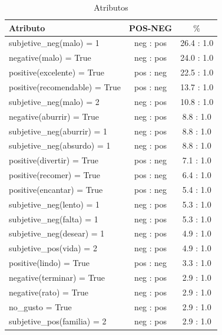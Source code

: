 \documentclass[12pt]{article}
\begin{document}
\begin{table}[!htb]
\begin{center}
\begin{tabular}{|l|c|c|} 
\hline
 \multicolumn{1}{|l}{Atributo}&
 \multicolumn{1}{|c}{POS-NEG}&
 \multicolumn{1}{|c|}{$\%$}
\tabularnewline
  \hline
     subjetive\_neg(malo) = 1         &        neg : pos    &     26.4 : 1.0 \\ \hline
          negative(malo) = True      &        neg : pos    &     24.0 : 1.0 \\ \hline
     positive(excelente) = True      &        pos : neg    &     22.5 : 1.0 \\ \hline
  positive(recomendable) = True      &        pos : neg    &     13.7 : 1.0 \\ \hline
     subjetive\_neg(malo) = 2         &        neg : pos    &     10.8 : 1.0 \\ \hline
       negative(aburrir) = True      &        neg : pos    &      8.8 : 1.0 \\ \hline
  subjetive\_neg(aburrir) = 1         &        neg : pos    &      8.8 : 1.0 \\ \hline
  subjetive\_neg(absurdo) = 1         &        neg : pos    &      8.8 : 1.0 \\ \hline
      positive(divertir) = True      &        pos : neg    &      7.1 : 1.0 \\ \hline
       positive(recomer) = True      &        pos : neg    &      6.4 : 1.0 \\ \hline
      positive(encantar) = True      &        pos : neg    &      5.4 : 1.0 \\ \hline
    subjetive\_neg(lento) = 1         &        neg : pos    &      5.3 : 1.0 \\ \hline
    subjetive\_neg(falta) = 1         &        neg : pos    &      5.3 : 1.0 \\ \hline
   subjetive\_neg(desear) = 1         &        neg : pos    &      4.9 : 1.0 \\ \hline
     subjetive\_pos(vida) = 2         &        neg : pos    &      4.9 : 1.0 \\ \hline
         positive(lindo) = True      &        pos : neg    &      3.3 : 1.0 \\ \hline
      negative(terminar) = True      &        neg : pos    &      2.9 : 1.0 \\ \hline
          negative(rato) = True      &        neg : pos    &      2.9 : 1.0 \\ \hline
                no\_gusto = True      &        neg : pos    &      2.9 : 1.0 \\ \hline
  subjetive\_pos(familia) = 2         &        neg : pos    &      2.9 : 1.0 \\ \hline

\end{tabular} 
\end{center}
\caption{Atributos} 
\label{tabla:atributos}
\end{table}
\end{document}
